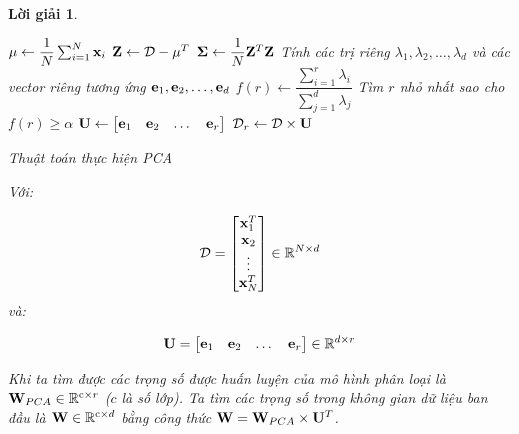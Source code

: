 \documentclass[14pt, a4paper]{article}
\theoremstyle{sltheorem}
\theoremstyle{soltheorem}
\newtheorem*{loigiai}{Lời giải}
\begin{document}
\begin{loigiai}
\begin{itemize}
        \begin{algorithm}[h!]
            \DontPrintSemicolon

            $\bold{\mu} \gets \dfrac{1}{N} \sum_{i=1}^N \bold{x}_i$\;
            $\bold{Z} \gets \mathcal{D} - \bold{\mu}^T$\;
            $\bold{\Sigma} \gets \dfrac{1}{N}\bold{Z}^T \bold{Z}$\;
            Tính các trị riêng $\lambda_1, \lambda_2, \dots, \lambda_d$ và các vector riêng tương ứng $\bold{e}_1, \bold{e}_2, \dots, \bold{e}_d$\;
            $f(r) \gets \dfrac{\sum_{i=1}^r \lambda_i}{\sum_{j=1}^d \lambda_j}$\;
            Tìm $r$ nhỏ nhất sao cho $f(r) \geq \alpha$\;
            $\bold{U} \gets \begin{bmatrix} \bold{e}_1  & \bold{e}_2  & \dots  & \bold{e}_r \end{bmatrix}$\;
            $\mathcal{D}_r \gets \mathcal{D} \times \bold{U}$\;
            \;
            \caption{Thuật toán thực hiện PCA}
        \end{algorithm}

        Với:

        \begin{equation*}
            \mathcal{D} = \begin{bmatrix}
                \bold{x}_1^T \\ \bold{x}_2 \\ \vdots \\ \bold{x}_N^T
            \end{bmatrix} \in \mathbb{R}^{N \times d}
        \end{equation*}
        và:

        \begin{equation*}
            \bold{U} = \begin{bmatrix}
                \bold{e}_1 & \bold{e}_2 & \dots & \bold{e}_r
            \end{bmatrix} \in \mathbb{R}^{d \times r}
        \end{equation*}

        Khi ta tìm được các trọng số được huấn luyện của mô hình phân loại là $\bold{W}_{PCA} \in \mathbb{R}^{\mathrm{c} \times r}$ ($c$ là số lớp).
        Ta tìm các trọng số trong không gian dữ liệu ban đầu là $\bold{W} \in \mathbb{R}^{\mathrm{c} \times d}$ bằng công thức $\bold{W} =   \bold{W}_{PCA} \times \bold{U}^T$.
    \end{itemize}
\end{loigiai}
\end{document}
